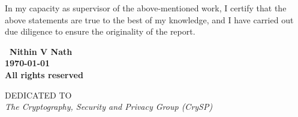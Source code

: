 \documentclass[oneside,12pt]{IIScthesisPSnPDF}
\newcommand{\blankpage}{
\newpage
\thispagestyle{empty}
\mbox{}
\newpage
}
\begin{document}
\noindent In my capacity as supervisor of the above-mentioned work, I certify
that the above statements are true to the best of my knowledge, and 
I have carried out due diligence to ensure the originality of the
report.

\vspace{20mm}

 \qquad



\blankpage

\vspace*{\fill}
\begin{center}
\large\bf \textcopyright \ Nithin V Nath\\
\large\bf \monthyeardate\today\\
\large\bf All rights reserved
\end{center}
\vspace*{\fill}
\thispagestyle{empty}

\blankpage

\vspace*{\fill}
\begin{center}
DEDICATED TO \\[2em]
\Large\it The Cryptography, Security and Privacy Group (CrySP)\\[2em]
\end{center}
\vspace*{\fill}
\thispagestyle{empty}

%

\end{document}
